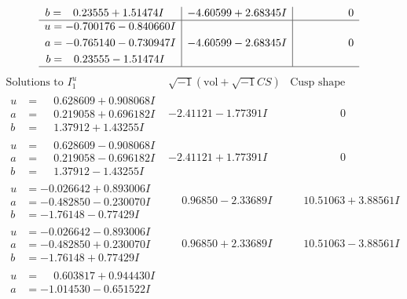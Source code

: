 \documentclass[1p]{elsarticle_modified}
\theoremstyle{definition}
\newcommand{\I}{\sqrt{-1}}
\begin{document}
$$\begin{array}{c|c|c}
\begin{aligned}
b &= \phantom{-}0.23555 + 1.51474 I\end{aligned}
 & -4.60599 + 2.68345 I & \phantom{-0.000000 } 0 \\ \hline\begin{aligned}
u &= -0.700176 - 0.840660 I \\
a &= -0.765140 - 0.730947 I \\
b &= \phantom{-}0.23555 - 1.51474 I\end{aligned}
 & -4.60599 - 2.68345 I & \phantom{-0.000000 } 0\\
 \hline 
 \end{array}$$\newpage$$\begin{array}{c|c|c}  
\text{Solutions to }I^u_{1}& \I (\text{vol} + \sqrt{-1}CS) & \text{Cusp shape}\\
 \hline 
\begin{aligned}
u &= \phantom{-}0.628609 + 0.908068 I \\
a &= \phantom{-}0.219058 + 0.696182 I \\
b &= \phantom{-}1.37912 + 1.43255 I\end{aligned}
 & -2.41121 - 1.77391 I & \phantom{-0.000000 } 0 \\ \hline\begin{aligned}
u &= \phantom{-}0.628609 - 0.908068 I \\
a &= \phantom{-}0.219058 - 0.696182 I \\
b &= \phantom{-}1.37912 - 1.43255 I\end{aligned}
 & -2.41121 + 1.77391 I & \phantom{-0.000000 } 0 \\ \hline\begin{aligned}
u &= -0.026642 + 0.893006 I \\
a &= -0.482850 - 0.230070 I \\
b &= -1.76148 - 0.77429 I\end{aligned}
 & \phantom{-}0.96850 - 2.33689 I & \phantom{-}10.51063 + 3.88561 I \\ \hline\begin{aligned}
u &= -0.026642 - 0.893006 I \\
a &= -0.482850 + 0.230070 I \\
b &= -1.76148 + 0.77429 I\end{aligned}
 & \phantom{-}0.96850 + 2.33689 I & \phantom{-}10.51063 - 3.88561 I \\ \hline\begin{aligned}
u &= \phantom{-}0.603817 + 0.944430 I \\
a &= -1.014530 - 0.651522 I \\

\end{aligned}
\end{array}$$
\end{document}
